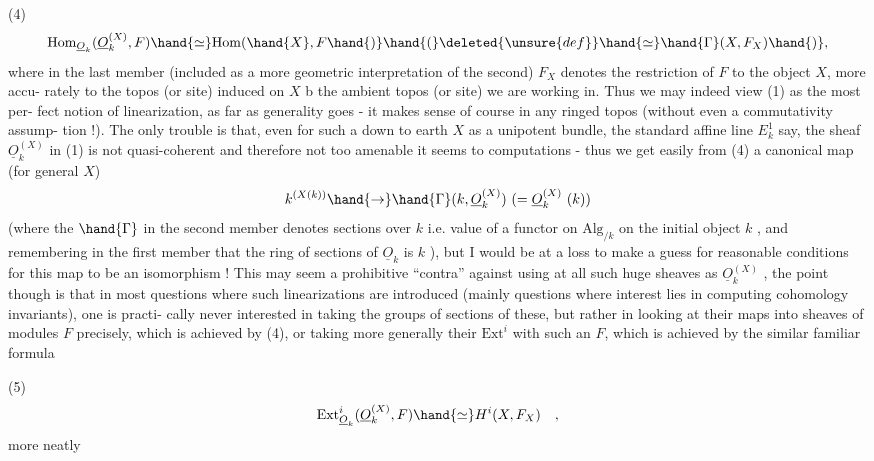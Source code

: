 
(4) \[ \mathrm{Hom}_{\underline{O}_k}( \underline{O}_k^{(X)}, F ) \hand{\simeq} \mathrm{Hom}(\hand{X},F\hand{)} \hand{(}\deleted{\unsure{def}}\hand{\simeq} \hand{\Gamma}(X,F_X)\hand{)}, \]
where in the last member (included as a more geometric interpretation of
the second) $F_X$ denotes the restriction of $F$ to the object $X$, more accu-%
rately to the topos (or site) induced on $X$ b the ambient topos (or
site) we are working in. Thus we may indeed view (1) as the most per-%
fect notion of linearization, as far as generality goes - it makes
sense of course in any ringed topos (without even a commutativity assump-%
tion !). The only trouble is that, even for such a down to earth $X$ as
a unipotent bundle,  the standard affine line $E_k^1$ say, the sheaf
$\underline{O}_k^{(X)}$ in (1) is not quasi-coherent and therefore not too amenable it
seems to computations - thus we get easily from (4) a canonical map
(for general $X$)
\[ k^{(X(k))} \hand{\to} \hand{\Gamma}(k, \underline{O}_k^{(X)}) \ (= \underline{O}_k^{(X)}\ (k)) \]
(where the $\hand{\Gamma}$ in the second member denotes sections over $k$ i.e. value of
a functor on $\mathrm{Alg}_{/k}$ on the initial object $k$ , and remembering in the
first member that the ring of sections of $\underline{O}_k$ is $k$ ), but I would be at
a loss to make a guess  for reasonable conditions for this map to
be an isomorphism ! This may seem a prohibitive ``contra'' against using
at all such huge sheaves as $\underline{O}_k^{(X)}$ , the point though is that in most
questions where such linearizations are introduced (mainly questions
where interest lies in computing cohomology invariants), one is practi-%
cally never interested in taking the groups of sections of these, but
rather in looking at their maps into sheaves of modules $F$ precisely,
which is achieved by (4), or taking more generally their $\mathrm{Ext}^i$ with
such an $F$, which is achieved by the similar familiar formula

(5) \[ \mathrm{Ext}^i_{\underline{O}_k}(\underline{O}_k^{(X)}, F ) \hand{\simeq} H^i(X,F_X) \quad , \]
more neatly

